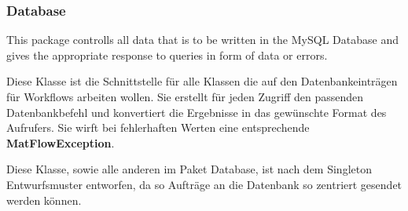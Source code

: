 \subsubsection{\label{database} Database}
This package controlls all data that is to be written in the MySQL Database and gives the appropriate response to queries in form of data or errors.


Diese Klasse ist die Schnittstelle für alle Klassen die auf den Datenbankeinträgen für Workflows arbeiten wollen. Sie erstellt für jeden Zugriff den passenden Datenbankbefehl und konvertiert die Ergebnisse in das gewünschte Format des Aufrufers.
Sie wirft bei fehlerhaften Werten eine entsprechende \textbf{MatFlowException}.

Diese Klasse, sowie alle anderen im Paket Database, ist nach dem Singleton Entwurfsmuster entworfen, da so Aufträge an die Datenbank so zentriert gesendet werden können.

